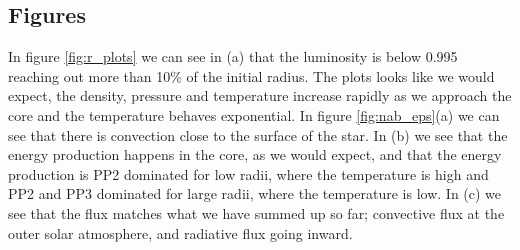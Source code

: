 \documentclass[a4paper,10pt]{article}
\begin{document}
\begin{figure}[H]
\centering
{}
\caption{}
\label{fig:cross}
\end{figure}

\subsection{Figures}
In figure \ref{fig:r_plots} we can see in (a) that the luminosity is below 0.995 reaching out more than 10\% of the initial radius. The plots looks like we would expect, the density, pressure and temperature increase rapidly as we approach the core and the temperature behaves exponential.
%
In figure \ref{fig:nab_eps}(a) we can see that there is convection close to the surface of the star. In (b) we see that the energy production happens in the core, as we would expect, and that the energy production is PP2 dominated for low radii, where the temperature is high and PP2 and PP3 dominated for large radii, where the temperature is low. In (c) we see that the flux matches what we have summed up so far; convective flux at the outer solar atmosphere, and radiative flux going inward.
\end{document}
